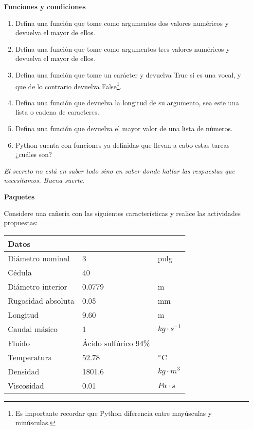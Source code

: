 \documentclass[12pt, oneside, a4paper, spanish]{article}
\begin{document}
\textbf{Funciones y condiciones}
\begin{enumerate}
	\item Defina una función que tome como argumentos dos valores numéricos y devuelva el mayor de ellos. 
	\item Defina una función que tome como argumentos tres valores numéricos y devuelva el mayor de ellos.
	\item Defina una función que tome un carácter y devuelva True si es una vocal, y que de lo contrario devuelva False\footnote{Es importante recordar que Python diferencia entre mayúsculas y minúsculas.}.
	\item Defina una función que devuelva la longitud de su argumento, sea este una lista o cadena de caracteres.
	\item Defina una función que devuelva el mayor valor de una lista de números.
	\item Python cuenta con funciones ya definidas que llevan a cabo estas tareas ¿cuáles son?
\end{enumerate}

\begin{center}
	\textit{El secreto no está en saber todo sino en saber donde hallar las respuestas que necesitamos. Buena suerte.}
\end{center}

\newpage

\textbf{Paquetes}

\vspace{0.7em}

Considere una cañería con las siguientes características y realice las actividades propuestas:

\begin{table}[h]
	\centering
	\begin{tabular}{lll}
		\toprule
		Datos &&\\ 
		\midrule
		Diámetro nominal&3&pulg\\
		Cédula&40&\\
		Diámetro interior&0.0779&m\\
		Rugosidad absoluta&0.05&mm\\
		Longitud&9.60&m\\
		Caudal másico&1&$kg \cdot s^{-1}$\\
		Fluido&Ácido sulfúrico 94\%&\\
		Temperatura&52.78&$\degree$C\\
		Densidad&1801.6&$kg \cdot m^{3}$\\
		Viscosidad&0.01&$Pa \cdot s$ \\
		\bottomrule
	\end{tabular}
\end{table}  
\end{document}
